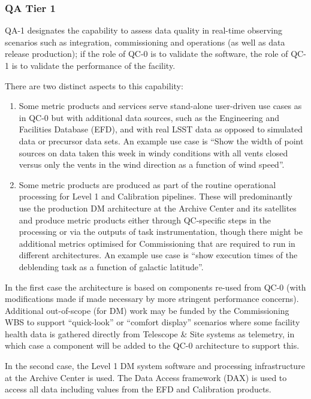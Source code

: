 \subsubsection{QA Tier 1}

QA-1 designates the capability to assess data quality in real-time observing scenarios such as integration, commissioning and operations (as well as data release production); if the role of QC-0 is to validate the software, the role of QC-1 is to validate the performance of the facility.

There are two distinct aspects to this capability:

\begin{enumerate}
\item Some metric products and services serve stand-alone user-driven use cases as in QC-0 but with additional data sources, such as the Engineering and Facilities Database (EFD), and with real LSST data as opposed to simulated data or precursor data sets.  An example use case is ``Show the width of point sources on data taken this week in windy conditions with all vents closed versus only the vents in the wind direction as a function of wind speed''.

\item Some metric products are produced as part of the routine operational processing for Level 1 and Calibration pipelines. These will predominantly use the production DM architecture at the Archive Center and its satellites and produce metric products either through QC-specific steps in the processing or via the outputs of task instrumentation, though there might be additional metrics optimised for Commissioning that are required to run in different architectures. An example use case is ``show execution times of the deblending task as a function of galactic latitude''.

\end{enumerate}

In the first case the architecture is based on components re-used from QC-0 (with modifications made if made necessary by more stringent performance concerns). Additional out-of-scope (for DM) work may be funded by the Commissioning WBS to support ``quick-look'' or ``comfort display'' scenarios where some facility health data is gathered directly from Telescope \& Site systems as telemetry, in which case a component will be added to the QC-0 architecture to support this.

In the second case, the Level 1 DM system software and processing infrastructure at the Archive Center is used. The Data Access framework (DAX) is used to access all data including values from the EFD and Calibration products.

